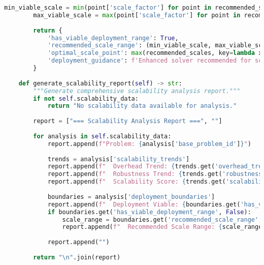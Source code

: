 \begin{lstlisting}[language=Python, caption=Scalability Analysis and Deployment Boundary Assessment]
        min_viable_scale = min(point['scale_factor'] for point in recommended_scales)
        max_viable_scale = max(point['scale_factor'] for point in recommended_scales)
        
        return {
            'has_viable_deployment_range': True,
            'recommended_scale_range': (min_viable_scale, max_viable_scale),
            'optimal_scale_point': max(recommended_scales, key=lambda x: x['cost_benefit_ratio'])['scale_factor'],
            'deployment_guidance': f'Enhanced solver recommended for scale factors {min_viable_scale:.1f}x to {max_viable_scale:.1f}x'
        }
    
    def generate_scalability_report(self) -> str:
        """Generate comprehensive scalability analysis report."""
        if not self.scalability_data:
            return "No scalability data available for analysis."
        
        report = ["=== Scalability Analysis Report ===", ""]
        
        for analysis in self.scalability_data:
            report.append(f"Problem: {analysis['base_problem_id']}")
            
            trends = analysis['scalability_trends']
            report.append(f"  Overhead Trend: {trends.get('overhead_trend', {}).get('direction', 'unknown')}")
            report.append(f"  Robustness Trend: {trends.get('robustness_trend', {}).get('direction', 'unknown')}")
            report.append(f"  Scalability Score: {trends.get('scalability_score', 0.0):.3f}")
            
            boundaries = analysis['deployment_boundaries']
            report.append(f"  Deployment Viable: {boundaries.get('has_viable_deployment_range', False)}")
            if boundaries.get('has_viable_deployment_range', False):
                scale_range = boundaries.get('recommended_scale_range', (0, 0))
                report.append(f"  Recommended Scale Range: {scale_range[0]:.1f}x to {scale_range[1]:.1f}x")
            
            report.append("")
        
        return "\n".join(report)
\end{lstlisting}